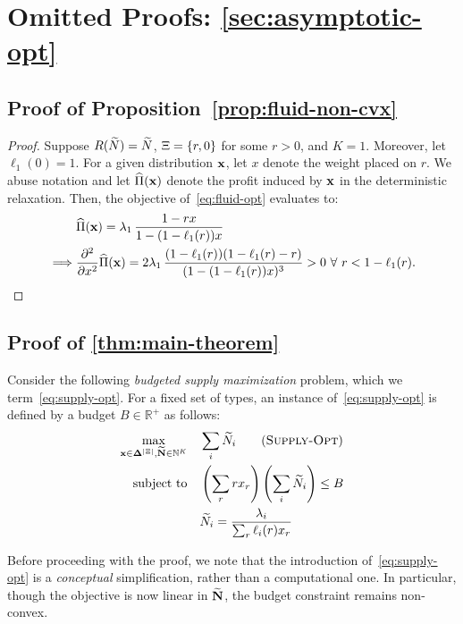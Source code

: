 \documentclass[12pt]{article}
\begin{document}
\section{Omitted Proofs: \cref{sec:asymptotic-opt}}\label{apx:structure-of-fluid}

\subsection{Proof of Proposition~\ref{prop:fluid-non-cvx}}

\begin{proof}
{Suppose} $R(\widetilde{N}) = \widetilde{N}$, $\Xi = \{r, 0\}$ for some $r > 0$, and $K = 1$. Moreover, let $\ell_1(0) = 1$. For a given distribution $\mathbf{x}$, let $x$ denote the weight placed on $r$. We abuse notation and let $\widehat{\Pi}(\mathbf{x})$ denote the profit induced by $\mathbf{x}$ in the deterministic relaxation. Then, the objective of~\ref{eq:fluid-opt} evaluates to:
\begin{align*}
&\widehat{\Pi}(\mathbf{x}) = \lambda_1 \, \frac{1-rx}{1 - (1-\ell_1(r))x} \\ \implies &\frac{\partial^2}{\partial x^2}\widehat{\Pi}(\mathbf{x}) = 2\lambda_1 \, \frac{(1-\ell_1(r))(1-\ell_1(r)-r)}{(1 - (1-\ell_1(r))x)^3} > 0 \  \forall \ r < 1-\ell_1(r).
\end{align*}
\end{proof}

\subsection{Proof of \cref{thm:main-theorem}}

{Consider the following {\it budgeted supply maximization} problem, which we term~\ref{eq:supply-opt}. {For a fixed set of types, an instance of~\ref{eq:supply-opt} is defined by a budget $B \in \mathbb{R}^+$ as follows:}}
\begin{align}\label{eq:supply-opt}
    \max_{{\xvec \in \simplex^{|\rewardset|}, \mathbf{\fluidn} \in \mathbb{N}^K}} \quad & \sum_i \fluidn_i \tag{\supplyopt} \\
    \text{subject to} \quad & \left(\sum_r rx_r\right)\left(\sum_i \fluidn_i\right) \leq B \notag\\
    & \fluidn_i=\frac{\lambda_i}{\sum_r \ell_i(r) x_r}\notag
\end{align}

{Before proceeding with the proof, we note that the introduction of~\ref{eq:supply-opt} is a {\it conceptual} simplification, rather than a computational one. In particular, though the objective is now linear in $\mathbf{\widetilde{N}}$, the budget constraint remains non-convex.}
\end{document}
